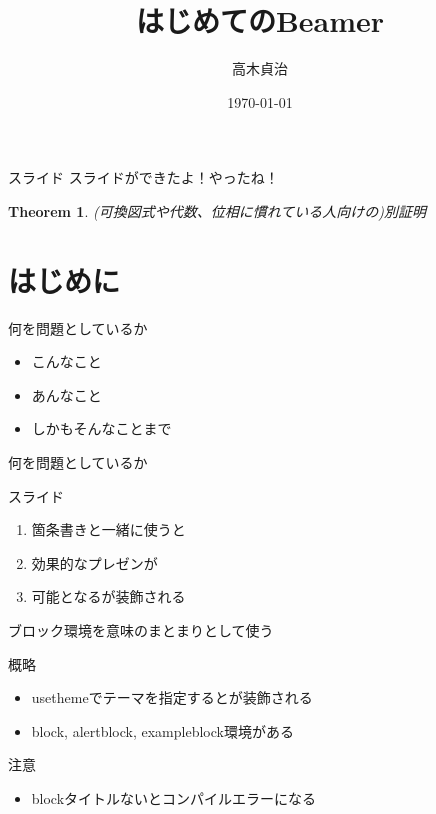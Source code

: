 \documentclass[utf8]{beamer}
\title{はじめてのBeamer}
\author{高木貞治}
\date{\today}
\newtheorem{thm}{Theorem}
\begin{document}
\maketitle
\begin{frame}{スライド}
 スライドができたよ！やったね！
\begin{thm}
 (可換図式や代数、位相に慣れている人向けの)別証明
\end{thm}
\end{frame}


\section{はじめに}
\begin{frame}{何を問題としているか}
\begin{itemize}
\item こんなこと
\item あんなこと
\item しかも\alert{そんなことまで}
\end{itemize}
\end{frame}


\begin{frame}{何を問題としているか}
\end{frame}

\begin{frame}{スライド}
\begin{enumerate}
\item 箇条書きと一緒に使うと
\item 効果的なプレゼンが
\item 可能となるが装飾される
\end{enumerate}
\end{frame}

\begin{frame}{ブロック環境を意味のまとまりとして使う}
  \begin{block}{概略}
    \begin{itemize}
      \item usethemeでテーマを指定するとが装飾される
      \item block, alertblock, exampleblock環境がある
    \end{itemize}
  \end{block}
  \begin{alertblock}{注意}
    \begin{itemize}
      \item blockタイトルないと\alert{コンパイルエラー}になる
    \end{itemize}
  \end{alertblock}
\end{frame}
\end{document}
